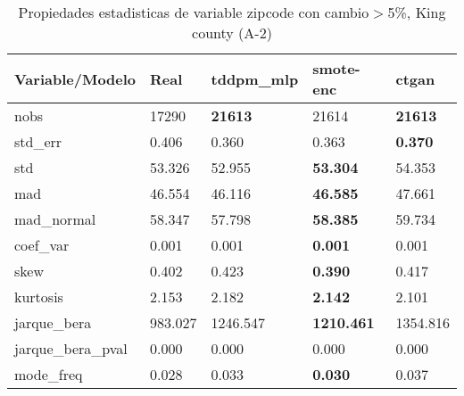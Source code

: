 \begin{table}[H]
\centering
\fontsize{8}{14}\selectfont
\caption{Propiedades estadisticas de variable zipcode con cambio\ensuremath{>}5\%, King county (A-2)}
\label{table-stats-king county-a-2-zipcode-short}
\begin{tabular}{|l|m{10em}|m{10em}|m{10em}|m{10em}|}
\hline
 \rowcolor[gray]{0.8}
Variable/Modelo & Real & tddpm\_mlp & smote-enc & ctgan \\
\hline nobs & 17290 & \bfseries 21613 & \cellcolor[rgb]{0.9, 0.54, 0.52} 21614 & \bfseries 21613 \\
\hline std\_err & 0.406 & \cellcolor[rgb]{0.9, 0.54, 0.52} 0.360 & 0.363 & \bfseries 0.370 \\
\hline std & 53.326 & 52.955 & \bfseries 53.304 & \cellcolor[rgb]{0.9, 0.54, 0.52} 54.353 \\
\hline mad & 46.554 & 46.116 & \bfseries 46.585 & \cellcolor[rgb]{0.9, 0.54, 0.52} 47.661 \\
\hline mad\_normal & 58.347 & 57.798 & \bfseries 58.385 & \cellcolor[rgb]{0.9, 0.54, 0.52} 59.734 \\
\hline coef\_var & 0.001 & 0.001 & \bfseries 0.001 & \cellcolor[rgb]{0.9, 0.54, 0.52} 0.001 \\
\hline skew & 0.402 & \cellcolor[rgb]{0.9, 0.54, 0.52} 0.423 & \bfseries 0.390 & 0.417 \\
\hline kurtosis & 2.153 & 2.182 & \bfseries 2.142 & \cellcolor[rgb]{0.9, 0.54, 0.52} 2.101 \\
\hline jarque\_bera & 983.027 & 1246.547 & \bfseries 1210.461 & \cellcolor[rgb]{0.9, 0.54, 0.52} 1354.816 \\
\hline jarque\_bera\_pval & 0.000 & 0.000 & 0.000 & 0.000 \\
\hline mode\_freq & 0.028 & 0.033 & \bfseries 0.030 & \cellcolor[rgb]{0.9, 0.54, 0.52} 0.037 \\
\hline
\end{tabular}
\end{table}
